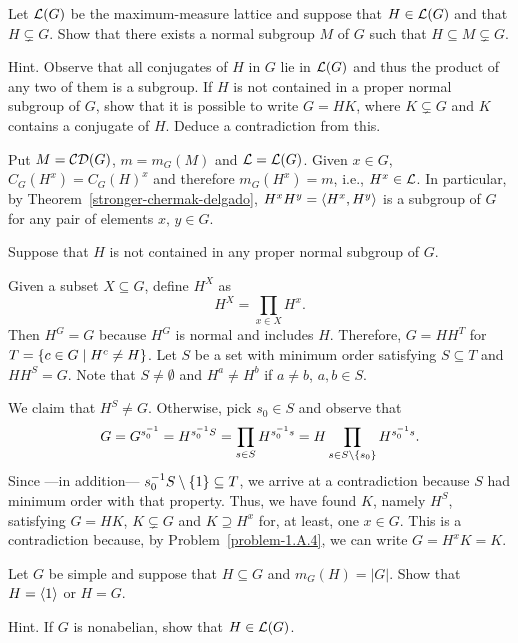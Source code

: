 \begin{probl}\label{problem-1.G.2}
    Let\/ ${\cal L}(G)$ be the maximum-measure lattice and suppose that\/ $H \in{\cal L}(G)$ and that\/ $H\varsubsetneq G$. Show that there exists a normal subgroup\/ $M$ of\/ $G$ such that\/ $H \subseteq M \varsubsetneq G$.

    \textrm{\upshape Hint. Observe that all conjugates of $H$ in $G$ lie in ${\cal L}(G)$ and thus the product of any two of them is a subgroup. If $H$ is not contained in a proper normal subgroup of $G$, show that it is possible to write $G=HK$, where $K\varsubsetneq G$ and $K$ contains a conjugate of $H$. Deduce a contradiction from this.}
\end{probl}

\begin{solution} Put $M=\operatorname{{\cal CD}}(G)$, $m=m_G(M)$ and ${\cal L}={\cal L}(G)$. Given $x\in G$, $C_G(H^x)=C_G(H)^x$ and therefore $m_G(H^x)=m$, i.e., $H^x\in\cal L$. In particular, by Theorem~\ref{stronger-chermak-delgado}, $H^xH^y = \langle H^x,H^y\rangle$ is a subgroup of $G$ for any pair of elements $x,\,y\in G$.

Suppose that $H$ is not contained in any proper normal subgroup of $G$.

Given a subset $X\subseteq G$, define $H^X$ as 
$$
    H^X = \prod_{x\in X}H^x.
$$
Then $H^G=G$ because $H^G$ is normal and includes $H$. Therefore, $G=HH^T$ for $T=\{c\in G\mid H^c\ne H\}$. Let $S$ be a set with minimum order satisfying $S\subseteq T$ and $HH^S=G$. Note that $S\ne\emptyset$ and $H^a\ne H^b$ if $a\ne b$, $a,b\in S$. 

We claim that $H^S\ne G$. Otherwise, pick $s_0\in S$ and observe that
$$
    G = G^{s_0^{-1}} = H^{s_0^{-1}S} = \prod_{s\in S}H^{s_0^{-1}s}
        =H\prod_{s\in S\setminus\{s_0\}}H^{s_0^{-1}s}.
$$
Since ---in addition--- $s_0^{-1}S\setminus\{1\}\subseteq T$, we arrive at a contradiction because $S$ had minimum order with that property. Thus, we have found $K$, namely $H^S$, satisfying $G=HK$, $K\varsubsetneq G$ and $K\supseteq H^x$ for, at least, one $x\in G$. This is a contradiction because, by Problem~\ref{problem-1.A.4}, we can write $G=H^xK=K$.  \end{solution}

\begin{probl}
    Let\/ $G$ be simple and suppose that\/ $H \subseteq G$ and\/ $m_G(H)=|G|$. Show that $H=\langle1\rangle$ or $H=G$.

    \textrm{\upshape Hint. If $G$ is nonabelian, show that $H \in{\cal L}(G)$}.
\end{probl}

